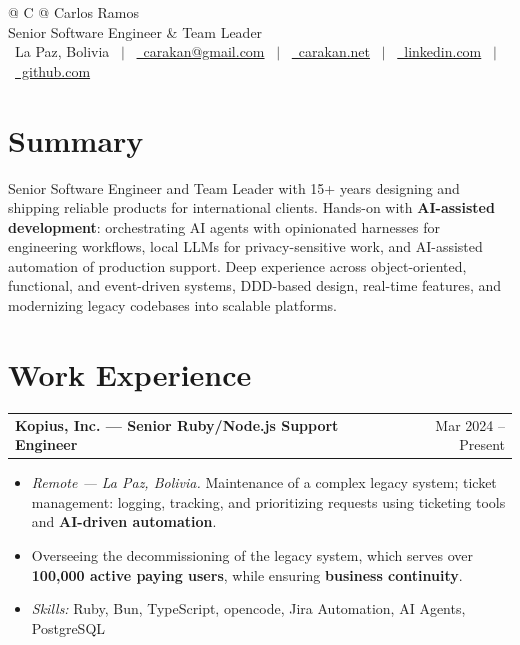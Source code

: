 \documentclass[a4paper,12pt]{article}
\makeatletter
\newcommand{\skillsfont}{\fontsize{9.6}{11.5}\selectfont}
\newenvironment{joblong}[2]
    {
    \begin{tabularx}{\linewidth}{@{}l X r@{}}
    \textbf{#1} & \hfill &  #2 \\[3.75pt]
    \end{tabularx}
    \begin{minipage}[t]{\linewidth}
    \begin{itemize}[nosep,after=\strut, leftmargin=1em, itemsep=3pt,label=--]
    }
    {
    \end{itemize}
    \end{minipage}
    }
\makeatother
\begin{document}
\pagestyle{empty}


\begin{tabularx}{\linewidth}{@{} C @{}}
\Huge{Carlos Ramos} \\[7.5pt]
\Large{Senior Software Engineer \& Team Leader} \\[7.5pt]
\raisebox{-0.05\height}\faMapMarker\ La Paz, Bolivia \ $|$ \
\href{mailto:carakan@gmail.com}{\raisebox{-0.05\height}\faEnvelope \ carakan@gmail.com} \ $|$ \
\href{https://carakan.net}{\raisebox{-0.05\height}\faGlobe \ carakan.net} \ $|$ \
\href{https://www.linkedin.com/in/carakan}{\raisebox{-0.05\height}\faLinkedin\ linkedin.com} \ $|$ \
\href{https://github.com/carakan}{\raisebox{-0.05\height}\faGithub\ github.com} \\
\end{tabularx}


\section{Summary}
Senior Software Engineer and Team Leader with 15+ years designing and shipping
reliable products for international clients. Hands-on with \textbf{AI-assisted
development}: orchestrating AI agents with opinionated harnesses for
engineering workflows, local LLMs for privacy-sensitive work, and AI-assisted
automation of production support.
Deep experience across object-oriented, functional, and event-driven systems,
DDD-based design, real-time features, and modernizing legacy codebases into
scalable platforms.

\section{Work Experience}

\begin{joblong}{Kopius, Inc. --- Senior Ruby/Node.js Support Engineer}{Mar 2024 -- Present}
\item \textit{Remote --- La Paz, Bolivia.} Maintenance of a complex legacy system;
      ticket management: logging, tracking, and prioritizing requests using
      ticketing tools and \textbf{AI-driven automation}.
\item Overseeing the decommissioning of the legacy system, which serves over
      \textbf{100,000 active paying users}, while ensuring \textbf{business
      continuity}.
\par\vspace{6pt}\item[]\skillsfont\textit{Skills:} Ruby, Bun, TypeScript, opencode, Jira Automation, AI Agents, PostgreSQL
\end{joblong}
\end{document}
